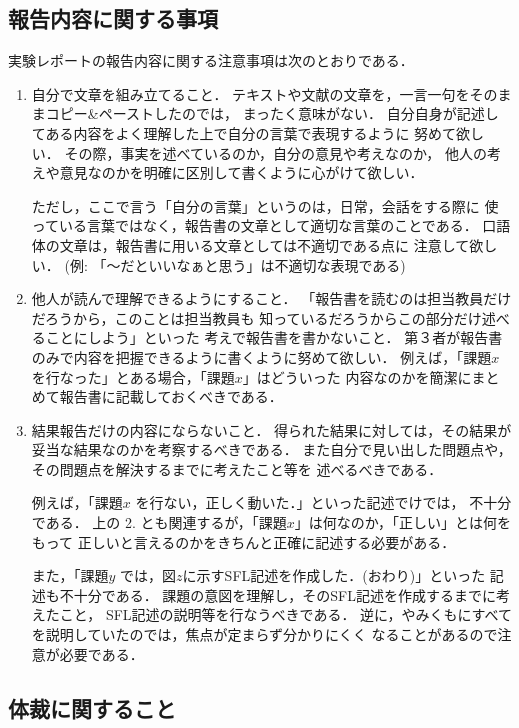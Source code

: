 \documentclass{jarticle}[11pt]
\begin{document}
\subsection{報告内容に関する事項}
実験レポートの報告内容に関する注意事項は次のとおりである．
\begin{enumerate}
\item 自分で文章を組み立てること．
テキストや文献の文章を，一言一句をそのままコピー\&ペーストしたのでは，
まったく意味がない．
自分自身が記述してある内容をよく理解した上で自分の言葉で表現するように
努めて欲しい．
その際，事実を述べているのか，自分の意見や考えなのか，
他人の考えや意見なのかを明確に区別して書くように心がけて欲しい．

ただし，ここで言う「自分の言葉」というのは，日常，会話をする際に
使っている言葉ではなく，報告書の文章として適切な言葉のことである．
{\gt 口語体の文章は，報告書に用いる文章としては不適切}である点に
注意して欲しい．
(例: 「〜だといいなぁと思う」は不適切な表現である)

\item 他人が読んで理解できるようにすること．
「報告書を読むのは担当教員だけだろうから，このことは担当教員も
知っているだろうからこの部分だけ述べることにしよう」といった
考えで報告書を書かないこと．
第３者が報告書のみで内容を把握できるように書くように努めて欲しい．
例えば，「課題$x$を行なった」とある場合，「課題$x$」はどういった
内容なのかを簡潔にまとめて報告書に記載しておくべきである．

\item 結果報告だけの内容にならないこと．
得られた結果に対しては，その結果が妥当な結果なのかを考察するべきである．
また自分で見い出した問題点や，その問題点を解決するまでに考えたこと等を
述べるべきである．

例えば，「課題$x$ を行ない，正しく動いた．」といった記述でけでは，
不十分である．
上の 2. とも関連するが，「課題$x$」は何なのか，「正しい」とは何をもって
正しいと言えるのかをきちんと正確に記述する必要がある．

また，「課題$y$ では，図$z$に示すSFL記述を作成した．(おわり)」といった
記述も不十分である．
課題の意図を理解し，そのSFL記述を作成するまでに考えたこと，
SFL記述の説明等を行なうべきである．
逆に，やみくもにすべてを説明していたのでは，焦点が定まらず分かりにくく
なることがあるので注意が必要である．
\end{enumerate}

\subsection{体裁に関すること}
\end{document}

